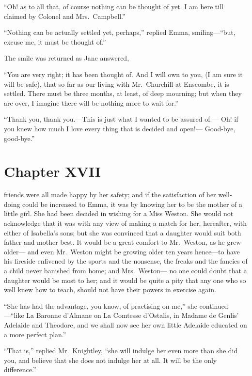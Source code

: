 ``Oh! as to all that, of course nothing can be thought of yet.
I am here till claimed by Colonel and Mrs.\ Campbell.''

``Nothing can be actually settled yet, perhaps,'' replied Emma,
smiling---``but, excuse me, it must be thought of.''

The smile was returned as Jane answered,

``You are very right; it has been thought of.  And I will own
to you, (I am sure it will be safe), that so far as our living
with Mr.\ Churchill at Enscombe, it is settled.  There must be
three months, at least, of deep mourning; but when they are over,
I imagine there will be nothing more to wait for.''

``Thank you, thank you.---This is just what I wanted to be assured of.---%
Oh! if you knew how much I love every thing that is decided and open!---%
Good-bye, good-bye.''



\chapter{Chapter XVII}


 friends were all made happy by her safety;
and if the satisfaction of her well-doing could be increased
to Emma, it was by knowing her to be the mother of a little girl.
She had been decided in wishing for a Miss Weston.  She would
not acknowledge that it was with any view of making a match
for her, hereafter, with either of Isabella's sons; but she was
convinced that a daughter would suit both father and mother best.
It would be a great comfort to Mr.\ Weston, as he grew older---%
and even Mr.\ Weston might be growing older ten years hence---to have
his fireside enlivened by the sports and the nonsense, the freaks
and the fancies of a child never banished from home; and Mrs.\ Weston---%
no one could doubt that a daughter would be most to her; and it
would be quite a pity that any one who so well knew how to teach,
should not have their powers in exercise again.

``She has had the advantage, you know, of practising on me,''
she continued---``like La Baronne d'Almane on La Comtesse d'Ostalis,
in Madame de Genlis' Adelaide and Theodore, and we shall now see
her own little Adelaide educated on a more perfect plan.''

``That is,'' replied Mr.\ Knightley, ``she will indulge her even more
than she did you, and believe that she does not indulge her at all.
It will be the only difference.''

